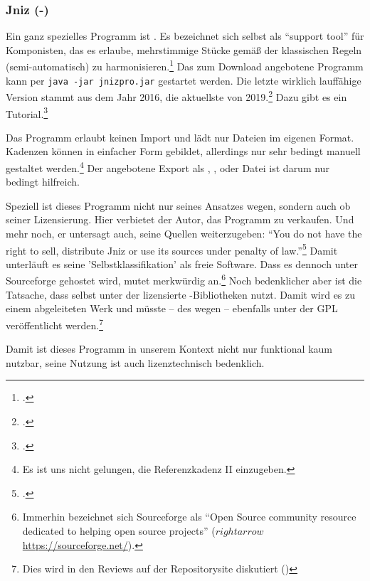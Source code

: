 %
%
%

\subsubsection{Jniz (-)}

\label{Jniz}Ein ganz spezielles Programm ist . Es bezeichnet sich
selbst als \enquote{support tool} für Komponisten, das es erlaube, mehrstimmige
Stücke gemäß der klassischen Regeln (semi-automatisch) zu
harmonisieren.\footcite[vgl.][\nopage wp]{Grandjean2019a} Das zum Download
angebotene Programm kann per \texttt{java -jar jnizpro.jar} gestartet werden.
Die letzte wirklich lauffähige Version stammt aus dem Jahr 2016, die aktuellste
von 2019.\footcite[vgl.][\nopage wp]{Jniz2019b} Dazu gibt es ein
Tutorial.\footcite[vgl.][\nopage wp]{Grandjean2019c}

Das Programm erlaubt keinen Import und lädt nur Dateien im eigenen Format.
Kadenzen können in einfacher Form gebildet, allerdings nur sehr bedingt manuell
gestaltet werden.\footnote{Es ist uns nicht gelungen, die Referenzkadenz II
einzugeben.} Der angebotene Export als , ,
 oder Datei ist darum nur bedingt hilfreich.

Speziell ist dieses Programm nicht nur seines Ansatzes wegen, sondern auch ob
seiner Lizensierung. Hier verbietet der Autor, das Programm zu verkaufen. Und
mehr noch, er untersagt auch, seine Quellen weiterzugeben: \enquote{You do not
have the right to sell, distribute Jniz or use its sources under penalty of
law.}\footcite[vgl.][\nopage wp]{Grandjean2019b} Damit unterläuft es seine
'Selbstklassifikation' als freie Software. Dass es dennoch unter Sourceforge
gehostet wird, mutet merkwürdig an.\footnote{Immerhin bezeichnet sich
Sourceforge als \enquote{Open Source community resource dedicated to helping
open source projects} ($rightarrow$ \href{https://sourceforge.net/}
{https://sourceforge.net/}).} Noch bedenklicher aber ist die Tatsache, dass
 selbst unter der  lizensierte -Bibliotheken
nutzt. Damit wird es zu einem abgeleiteten Werk und müsste -- des
 wegen -- ebenfalls unter der GPL veröffentlicht
werden.\footnote{Dies wird in den Reviews auf der Repositorysite diskutiert
(\cite[vgl.][\nopage wp]{Jniz2019a})}

Damit ist dieses Programm in unserem Kontext nicht nur funktional kaum nutzbar,
seine Nutzung ist auch lizenztechnisch bedenklich.



%
